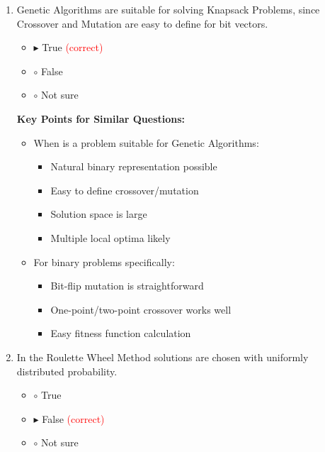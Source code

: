 \begin{enumerate}[label=\alph*)]
\item Genetic Algorithms are suitable for solving Knapsack Problems, since Crossover and Mutation are easy to define for bit vectors.
\begin{itemize}
\item $\blacktriangleright$ True \hspace{1em} \textcolor{red}{(correct)}
\item $\circ$ False
\item $\circ$ Not sure
\end{itemize}

\textbf{Key Points for Similar Questions:}
\begin{itemize}
\item When is a problem suitable for Genetic Algorithms:
  \begin{itemize}
  \item Natural binary representation possible
  \item Easy to define crossover/mutation
  \item Solution space is large
  \item Multiple local optima likely
  \end{itemize}
\item For binary problems specifically:
  \begin{itemize}
  \item Bit-flip mutation is straightforward
  \item One-point/two-point crossover works well
  \item Easy fitness function calculation
  \end{itemize}
\end{itemize}

\item In the Roulette Wheel Method solutions are chosen with uniformly distributed probability.
\begin{itemize}
\item $\circ$ True
\item $\blacktriangleright$ False \hspace{1em} \textcolor{red}{(correct)}
\item $\circ$ Not sure
\end{itemize}


\end{enumerate}
